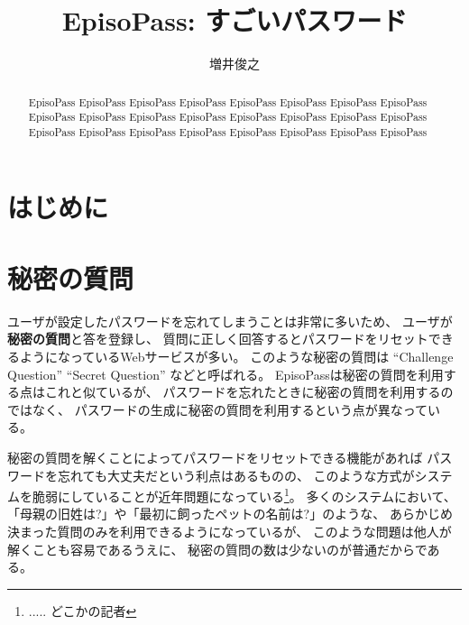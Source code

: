 \documentclass[twoside]{wiss}
\begin{document}

\title{EpisoPass: すごいパスワード}

\author{増井俊之}

\begin{abstract}
EpisoPass EpisoPass EpisoPass EpisoPass EpisoPass EpisoPass 
EpisoPass EpisoPass EpisoPass EpisoPass EpisoPass EpisoPass 
EpisoPass EpisoPass EpisoPass EpisoPass EpisoPass EpisoPass 
EpisoPass EpisoPass EpisoPass EpisoPass EpisoPass EpisoPass 
\end{abstract}

\maketitle

\section{はじめに}

\cite{Kaneko}

\section{秘密の質問}

ユーザが設定したパスワードを忘れてしまうことは非常に多いため、
ユーザが\textbf{秘密の質問}と答を登録し、
質問に正しく回答するとパスワードをリセットできるようになっているWebサービスが多い。
このような秘密の質問は
``Challenge Question''
``Secret Question''
などと呼ばれる。
EpisoPassは秘密の質問を利用する点はこれと似ているが、
パスワードを忘れたときに秘密の質問を利用するのではなく、
パスワードの生成に秘密の質問を利用するという点が異なっている。

秘密の質問を解くことによってパスワードをリセットできる機能があれば
パスワードを忘れても大丈夫だという利点はあるものの、
このような方式がシステムを脆弱にしていることが近年問題になっている\footnote{
  ..... どこかの記者
}。
多くのシステムにおいて、
「母親の旧姓は?」や「最初に飼ったペットの名前は?」のような、
あらかじめ決まった質問のみを利用できるようになっているが、
このような問題は他人が解くことも容易であるうえに、
秘密の質問の数は少ないのが普通だからである\cite{Rabkin:2008:PKQ:1408664.1408667}。
\end{document}
